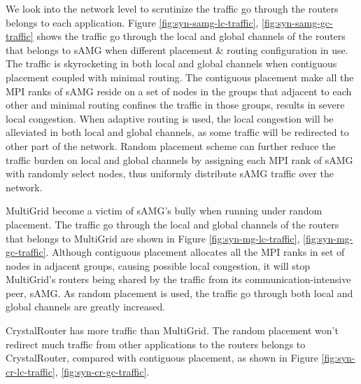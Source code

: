 \documentclass[conference,compsoc]{IEEEtran}
\begin{document}
We look into the network level to scrutinize the traffic go through the routers belongs to each application. 
Figure \ref{fig:syn-samg-lc-traffic}, \ref{fig:syn-samg-gc-traffic} shows the traffic go through the local and global channels of the routers that belongs to sAMG when different placement \& routing configuration in use. The traffic is skyrocketing in both local and global channels when contiguous placement coupled with minimal routing. The contiguous placement make all the MPI ranks of sAMG reside on a set of nodes in the groups that adjacent to each other and minimal routing confines the traffic in those groups, results in severe local congestion. When adaptive routing is used, the local congestion will be alleviated in both local and global channels, as some traffic will be redirected to other part of the network. Random placement scheme can further reduce the traffic burden on local and global channels by assigning each MPI rank of sAMG with randomly select nodes, thus uniformly distribute sAMG traffic over the network. 

MultiGrid become a victim of sAMG's bully when running under random placement. The traffic go through the local and global channels of the routers that belongs to MultiGrid are shown in Figure \ref{fig:syn-mg-lc-traffic}, \ref{fig:syn-mg-gc-traffic}. Although contiguous placement allocates all the MPI ranks in set of nodes in adjacent groups, causing possible local congestion, it will stop MultiGrid's routers being shared by the traffic from its communication-intensive peer, sAMG. As random placement is used, the traffic go through both local and global channels are greatly increased. 

CrystalRouter has more traffic than MultiGrid. The random placement won't redirect much traffic from other applications to the routers belongs to CrystalRouter, compared with contiguous placement, as shown in Figure \ref{fig:syn-cr-lc-traffic}, \ref{fig:syn-cr-gc-traffic}.
\end{document}
